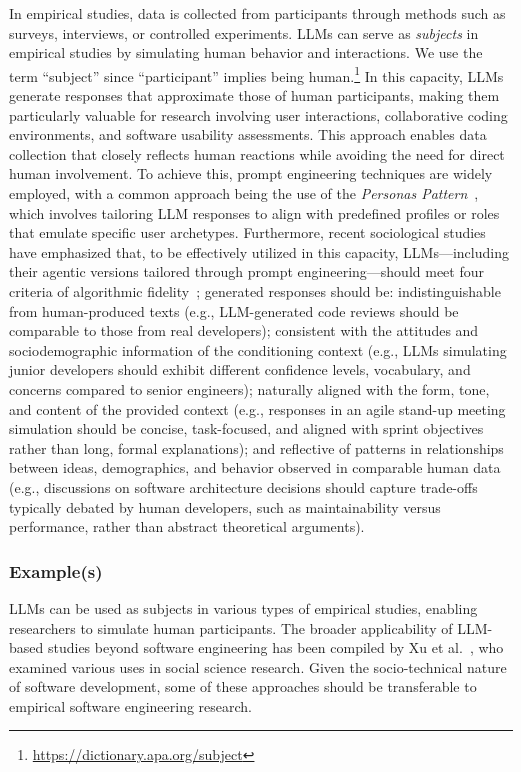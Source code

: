 In empirical studies, data is collected from participants through methods such as surveys, interviews, or controlled experiments.
LLMs can serve as \emph{subjects} in empirical studies by simulating human behavior and interactions.
We use the term ``subject'' since ``participant'' implies being human.\footnote{\url{https://dictionary.apa.org/subject}}
In this capacity, LLMs generate responses that approximate those of human participants, making them particularly valuable for research involving user interactions, collaborative coding environments, and software usability assessments. This approach enables data collection that closely reflects human reactions while avoiding the need for direct human involvement.
To achieve this, prompt engineering techniques are widely employed, with a common approach being the use of the \textit{Personas Pattern}~\cite{DBLP:journals/corr/abs-2308-07702}, which involves tailoring LLM responses to align with predefined profiles or roles that emulate specific user archetypes. 
Furthermore, recent sociological studies have emphasized that, to be effectively utilized in this capacity, LLMs—including their agentic versions tailored through prompt engineering—should meet four criteria of algorithmic fidelity~\cite{DBLP:journals/corr/abs-2209-06899}; generated responses should be: indistinguishable from human-produced texts (e.g., LLM-generated code reviews should be comparable to those from real developers); consistent with the attitudes and sociodemographic information of the conditioning context (e.g., LLMs simulating junior developers should exhibit different confidence levels, vocabulary, and concerns compared to senior engineers); naturally aligned with the form, tone, and content of the provided context (e.g., responses in an agile stand-up meeting simulation should be concise, task-focused, and aligned with sprint objectives rather than long, formal explanations); and reflective of patterns in relationships between ideas, demographics, and behavior observed in comparable human data (e.g., discussions on software architecture decisions should capture trade-offs typically debated by human developers, such as maintainability versus performance, rather than abstract theoretical arguments).

\subsubsection{Example(s)}

LLMs can be used as subjects in various types of empirical studies, enabling researchers to simulate human participants.
The broader applicability of LLM-based studies beyond software engineering has been compiled by Xu et al.~\cite{DBLP:journals/ipm/XuSRGPLSH24}, who examined various uses in social science research.
Given the socio-technical nature of software development, some of these approaches should be transferable to empirical software engineering research.

